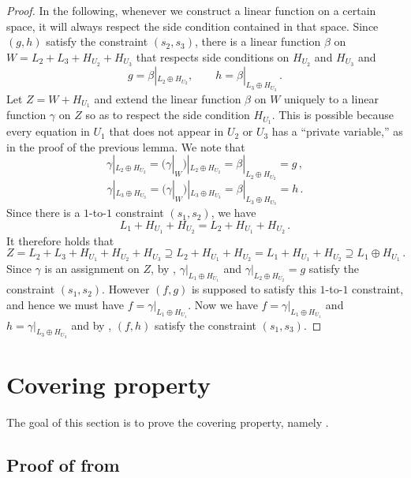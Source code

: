 \documentclass{toc}
\newcommand*\xor{\mathbin{\oplus}}
\begin{document}
\begin{proof} In the following, whenever we construct a linear function on a certain space, it will always respect the side condition contained in that
space. Since $(g,h)$ satisfy the constraint $(s_2, s_3)$, there is a linear function $\beta$ on $W = L_2 + L_3 + H_{U_2} + H_{U_3}$ that respects
side conditions on $H_{U_2}$ and $H_{U_3}$ and
  $$g = \beta|_{L_2 \xor H_{U_2}},  \quad \quad h = \beta|_{L_3 \xor H_{U_3}}\,.$$%
Let $Z = W + H_{U_1}$ and extend the linear function $\beta$ on $W$ uniquely to a linear function $\gamma$ on $Z$ so as to respect the side condition $H_{U_1}$.  This is possible because
every equation in $U_1$ that does not appear in $U_2$ or
$U_3$ has a ``private variable,'' as in the proof of the previous lemma. We note that
 $$\gamma|_{L_2 \xor H_{U_2}} = (\gamma|_W)|_{L_2 \xor H_{U_2}} = \beta|_{L_2 \xor H_{U_2}} = g\,,$$%
  $$\gamma|_{L_3 \xor H_{U_3}} = (\gamma|_W)|_{L_3 \xor H_{U_3}} = \beta|_{L_3 \xor H_{U_3}} = h\,.$$%
Since there is a $1$-to-$1$ constraint $(s_1, s_2)$, we have
  $$L_1 +  H_{U_1} + H_{U_2} =  L_2 + H_{U_1} + H_{U_2}\,.$$%
It therefore holds  that
 $$ Z =  L_2 + L_3 + H_{U_1} + H_{U_2} + H_{U_3}  \supseteq L_2 + H_{U_1} + H_{U_2} = L_1 + H_{U_1} + H_{U_2} \supseteq L_1 \xor H_{U_1}\,.$$%
Since $\gamma$ is an assignment on $Z$, by , $\gamma|_{L_1 \xor H_{U_1}}$ and $\gamma|_{L_2 \xor H_{U_2}} = g$
satisfy the constraint $(s_1, s_2)$. However $(f,g)$ is supposed to satisfy this $1$-to-$1$ constraint, and hence we must have $f = \gamma|_{L_1 \xor H_{U_1}}$.
Now we have
  $f = \gamma|_{L_1 \xor H_{U_1}}$ and $h = \gamma|_{L_3 \xor H_{U_3}}$ and by , $(f,h)$ satisfy the constraint $(s_1, s_3)$.
\end{proof}

\section{Covering property}\label{appendix:covering}
The goal of this section is to prove the covering property, namely
 .
\subsection*{Proof of  from }
\end{document}
